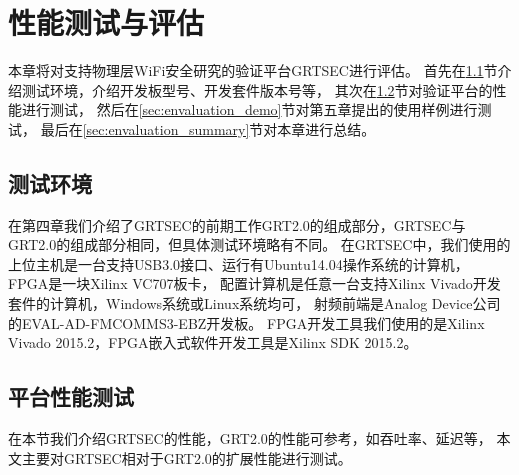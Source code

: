 
\chapter{性能测试与评估}
本章将对支持物理层WiFi安全研究的验证平台GRTSEC进行评估。
首先在\ref{sec:envaluation_env_setup}节介绍测试环境，介绍开发板型号、开发套件版本号等，
其次在\ref{sec:envaluation_performance}节对验证平台的性能进行测试，
然后在\ref{sec:envaluation_demo}节对第五章提出的使用样例进行测试，
最后在\ref{sec:envaluation_summary}节对本章进行总结。

  \section{测试环境}\label{sec:envaluation_env_setup}
  在第四章我们介绍了GRTSEC的前期工作GRT2.0的组成部分，GRTSEC与GRT2.0的组成部分相同，但具体测试环境略有不同。
  在GRTSEC中，我们使用的上位主机是一台支持USB3.0接口、运行有Ubuntu14.04操作系统的计算机，
  FPGA是一块Xilinx VC707板卡\cite{xilinxvc707}，
  配置计算机是任意一台支持Xilinx Vivado开发套件的计算机，Windows系统或Linux系统均可，
  射频前端是Analog Device公司的EVAL-AD-FMCOMMS3-EBZ开发板\cite{fmcomms3}。
  FPGA开发工具我们使用的是Xilinx Vivado 2015.2，FPGA嵌入式软件开发工具是Xilinx SDK 2015.2。

  \section{平台性能测试}\label{sec:envaluation_performance}
  在本节我们介绍GRTSEC的性能，GRT2.0的性能可参考\cite{cjh16grt}，如吞吐率、延迟等，
  本文主要对GRTSEC相对于GRT2.0的扩展性能进行测试。


